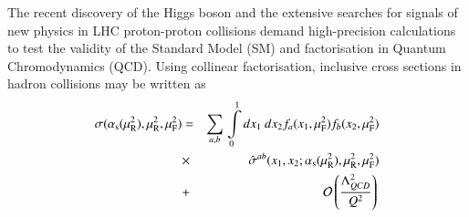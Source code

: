 The recent discovery of the Higgs boson \cite{Aad:2012tfa,Chatrchyan:2012ufa} 
and the extensive searches
for signals of new physics in LHC proton-proton collisions
demand high-precision calculations to test the validity of the Standard Model (SM)
and factorisation in Quantum Chromodynamics (QCD).
Using collinear factorisation, inclusive cross sections in hadron collisions may be written as
%
\begin{eqnarray}
\small
%
\sigma(\as(\mur^2),\mur^2,\muf^2)&=& \sum\limits_{a,b}\,  \int\limits_{0}\limits^{1} dx_1\ dx_2  f_a(x_1,\muf^2) f_b(x_2,\muf^2) \nonumber \\ 
&\times&  \, \hat{\sigma}^{ab}(x_1,x_2;\as(\mur^2),\mur^2,\muf^2)  \nonumber \\
&+&{\cal O}\left(\frac{\Lambda_{QCD}^2}{Q^2}\right)\,
\label{eq:fact}
\end{eqnarray}
